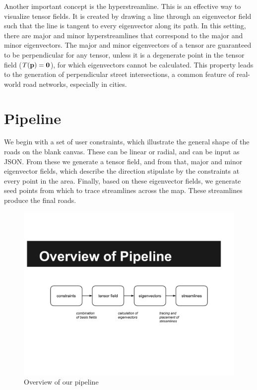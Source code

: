 \documentclass[twocolumn]{article}
\begin{document}
Another important concept is the hyperstreamline. This is an effective way to
visualize tensor fields. It is created by drawing a line through an eigenvector
field such that the line is tangent to every eigenvector along its path. In
this setting, there are major and minor hyperstreamlines that correspond to the
major and minor eigenvectors. The major and minor eigenvectors of a tensor are
guaranteed to be perpendicular for any tensor, unless it is a degenerate point
in the tensor field ($T(\bf p)=0$), for which eigenvectors cannot be
calculated. This property leads to the generation of perpendicular street
intersections, a common feature of real-world road networks, especially in
cities.

\section{Pipeline}
We begin with a set of user constraints, which illustrate the general shape of
the roads on the blank canvas. These can be linear or radial, and can be input
as JSON. From these we generate a tensor field, and from that, major and minor
eigenvector fields, which describe the direction stipulate by the constraints at
every point in the area. Finally, based on these eigenvector fields, we generate
seed points from which to trace streamlines across the map. These streamlines
produce the final roads.


\begin{figure}[t!]
\begin{center}
    \includegraphics[width=5.5in]{images/pipeline.pdf}
\end{center}
\caption{Overview of our pipeline}
\label{fig:pipeline}
\end{figure}
\end{document}
